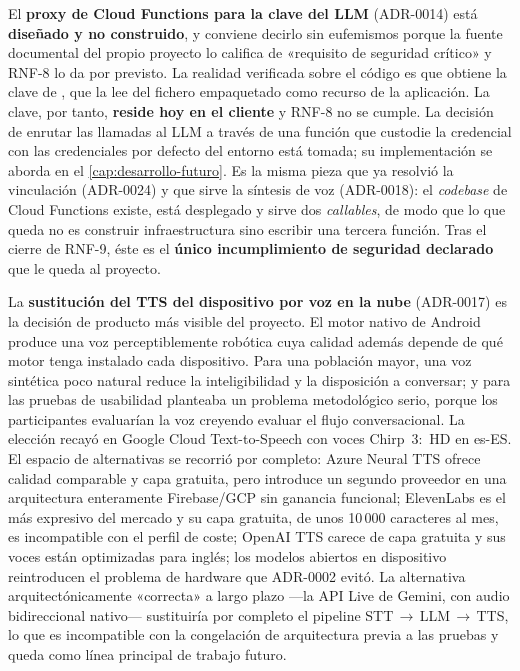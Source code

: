 El \textbf{proxy de Cloud Functions para la clave del LLM} (ADR-0014) está \textbf{diseñado y no
construido}, y conviene decirlo sin eufemismos porque la fuente documental del propio proyecto lo califica
de «requisito de seguridad crítico» y RNF-8 lo da por previsto. La realidad verificada sobre el código es
que  obtiene la clave de , que la lee del fichero 
empaquetado como recurso de la aplicación. La clave, por tanto, \textbf{reside hoy en el cliente} y RNF-8
no se cumple. La decisión de enrutar las llamadas al LLM a través de una función que custodie la
credencial con las credenciales por defecto del entorno está tomada; su implementación se aborda en el
\autoref{cap:desarrollo-futuro}. Es la misma pieza que ya resolvió la vinculación (ADR-0024) y que sirve la
síntesis de voz (ADR-0018): el \emph{codebase} de Cloud Functions existe, está desplegado y sirve dos
\emph{callables}, de modo que lo que queda no es construir infraestructura sino escribir una tercera función.
Tras el cierre de RNF-9, éste es el \textbf{único incumplimiento de seguridad declarado} que le queda al
proyecto.

La \textbf{sustitución del TTS del dispositivo por voz en la nube} (ADR-0017) es la decisión de producto
más visible del proyecto. El motor nativo de Android produce una voz perceptiblemente robótica cuya calidad
además depende de qué motor tenga instalado cada dispositivo. Para una población mayor, una voz sintética
poco natural reduce la inteligibilidad y la disposición a conversar; y para las pruebas de usabilidad
planteaba un problema metodológico serio, porque los participantes evaluarían la voz creyendo evaluar el
flujo conversacional. La elección recayó en Google Cloud Text-to-Speech con voces Chirp~3:~HD en es-ES. El
espacio de alternativas se recorrió por completo: Azure Neural TTS ofrece calidad comparable y capa
gratuita, pero introduce un segundo proveedor en una arquitectura enteramente Firebase/GCP sin ganancia
funcional; ElevenLabs es el más expresivo del mercado y su capa gratuita, de unos 10\,000 caracteres al
mes, es incompatible con el perfil de coste; OpenAI TTS carece de capa gratuita y sus voces están
optimizadas para inglés; los modelos abiertos en dispositivo reintroducen el problema de hardware que
ADR-0002 evitó. La alternativa arquitectónicamente «correcta» a largo plazo ---la API Live de Gemini, con
audio bidireccional nativo--- sustituiría por completo el pipeline STT\,$\rightarrow$\,LLM\,$\rightarrow$\,TTS,
lo que es incompatible con la congelación de arquitectura previa a las pruebas y queda como línea principal
de trabajo futuro.

